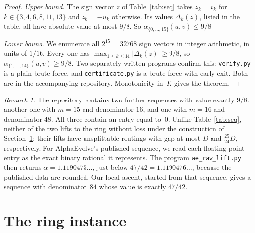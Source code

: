 \documentclass[11pt]{article}
\theoremstyle{plain}
\theoremstyle{definition}
\theoremstyle{remark}
\newtheorem{remark}[theorem]{Remark}
\begin{document}
\begin{proof}
\emph{Upper bound.} The sign vector $z$ of Table~\ref{tab:seq} takes $z_k=v_k$ for $k\in\{3,4,6,8,11,13\}$ and $z_k=-u_k$ otherwise. Its values $\Delta_k(z)$, listed in the table, all have absolute value at most $9/8$. So $\alpha_{\{0,\dots,15\}}(u,v)\le 9/8$.

\emph{Lower bound.} We enumerate all $2^{15}=32768$ sign vectors in integer arithmetic, in units of $1/16$. Every one has $\max_{1\le k\le 14}|\Delta_k(z)|\ge 9/8$, so $\alpha_{\{1,\dots,14\}}(u,v)\ge 9/8$. Two separately written programs confirm this: \texttt{verify.py} is a plain brute force, and \texttt{certificate.py} is a brute force with early exit. Both are in the accompanying repository. Monotonicity in~$K$ gives the theorem.
\end{proof}

\begin{remark}\label{rem:others}
The repository contains two further sequences with value exactly $9/8$: another one with $m=15$ and denominator $16$, and one with $m=16$ and denominator $48$. All three contain an entry equal to~$0$.
Unlike Table~\ref{tab:seq}, neither of the two lifts to the ring without loss under the construction of Section~\ref{sec:ring}: their lifts have unsplittable routings with gap at most $D$ and $\tfrac{25}{24}D$, respectively.
For AlphaEvolve's published sequence, we read each floating-point entry as the exact binary rational it represents. The program \texttt{ae\_raw\_lift.py} then returns $\alpha=1.1190475\ldots$, just below $47/42=1.1190476\ldots$, because the published data are rounded.
Our local ascent, started from that sequence, gives a sequence with denominator~$84$ whose value is exactly $47/42$.
\end{remark}

\section{The ring instance}\label{sec:ring}
\end{document}
